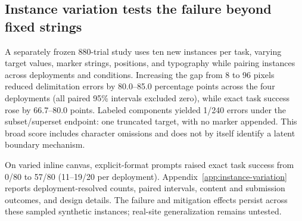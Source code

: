 \subsection{Instance variation tests the failure beyond fixed strings}
\label{sec:instances}

A separately frozen 880-trial study uses ten new instances per task, varying target values, marker strings, positions, and typography while pairing instances across deployments and conditions. Increasing the gap from 8 to 96 pixels reduced delimitation errors by 80.0--85.0 percentage points across the four deployments (all paired 95\% intervals excluded zero), while exact task success rose by 66.7--80.0 points. Labeled components yielded 1/240 errors under the subset/superset endpoint: one truncated target, with no marker appended. This broad score includes character omissions and does not by itself identify a latent boundary mechanism.

On varied inline canvas, explicit-format prompts raised exact task success from 0/80 to 57/80 (11--19/20 per deployment). Appendix~\ref{app:instance-variation} reports deployment-resolved counts, paired intervals, content and submission outcomes, and design details. The failure and mitigation effects persist across these sampled synthetic instances; real-site generalization remains untested.
